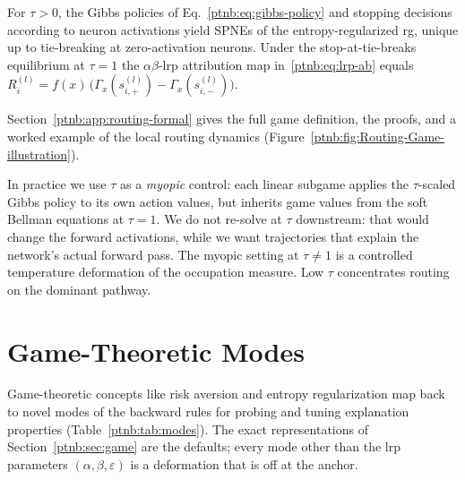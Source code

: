 \begin{theoremenv}\label{ptnb:thm:lrp-recovery}\label{thm:lrp_recovery}
For $\tau>0$, the Gibbs policies of Eq.~\eqref{ptnb:eq:gibbs-policy} and stopping decisions according to
neuron activations yield SPNEs of the entropy-regularized \ac{rg}, unique up to tie-breaking at
zero-activation neurons. Under the stop-at-tie-breaks equilibrium at $\tau=1$ the
$\alpha\beta$-\ac{lrp} attribution map in~\eqref{ptnb:eq:lrp-ab} equals $R_i^{(l)} =
    f(x)\,\bigl(\Gamma_x(s_{i,+}^{(l)}) - \Gamma_x(s_{i,-}^{(l)})\bigr)$.
\hfill{}
\end{theoremenv}
Section~\ref{ptnb:app:routing-formal} gives the full game definition, the proofs, and a worked example
of the local routing dynamics (Figure~\ref{ptnb:fig:Routing-Game-illustration}).

In practice we use $\tau$ as a \emph{myopic} control: each linear subgame applies the $\tau$-scaled
Gibbs policy to its own action values, but inherits game values from the soft Bellman equations at
$\tau{=}1$. We do not re-solve at $\tau$ downstream: that would change the forward activations,
while we want trajectories that explain the network's actual forward pass. The myopic setting at
$\tau\neq 1$ is a controlled temperature deformation of the occupation measure.
Low $\tau$ concentrates routing on the dominant pathway.

\section{Game-Theoretic Modes}\label{ptnb:sec:modes}\label{sec:risk_aversion_regularization}\label{ptnb:sec:controls}

Game-theoretic concepts like risk aversion and entropy regularization map back to novel modes of
the backward rules for probing and tuning explanation properties (Table~\ref{ptnb:tab:modes}). The exact
representations of Section~\ref{ptnb:sec:game} are the defaults; every mode other than the \ac{lrp}
parameters $(\alpha,\beta,\varepsilon)$ is a deformation that is off at the anchor.

